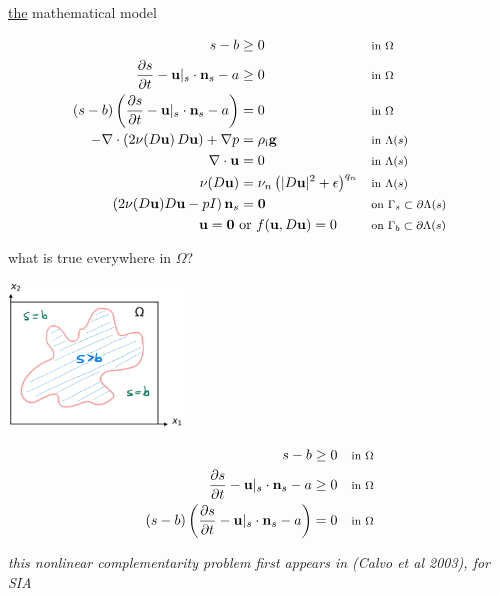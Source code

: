 \documentclass[10pt,dvipsnames]{beamer}
\newcommand{\bg}{\mathbf{g}}
\newcommand{\bn}{\mathbf{n}}
\newcommand{\bu}{\mathbf{u}}
\newcommand{\bzero}{\bm{0}}
\newcommand{\eps}{\epsilon}
\newcommand{\rhoi}{\rho_{\text{i}}}
\newcommand{\where}[1]{\text{\footnotesize #1}}
\begin{document}
\begin{frame}{\underline{the} mathematical model}

\begin{align*}
s - b &\ge 0 & &\where{in $\Omega$} \\
\frac{\partial s}{\partial t} - \bu|_s \cdot \bn_s - a &\ge 0 & &\where{in $\Omega$} \\
(s - b) \left(\frac{\partial s}{\partial t} - \bu|_s \cdot \bn_s - a\right) &= 0 & &\where{in $\Omega$} \\
- \nabla \cdot \left(2 \nu(D\bu)\, D\bu\right) + \nabla p &= \rhoi \bg && \where{in $\Lambda(s)$} \\
\nabla \cdot \bu &= 0 && \where{in $\Lambda(s)$} \\
\nu(D\bu) &= \nu_n \left(|D\bu|^2 + \eps\right)^{q_n} && \where{in $\Lambda(s)$} \\
\left(2 \nu(D\bu) D\bu - pI\right) \bn_s &= \bzero && \where{on $\Gamma_s \subset \partial\Lambda(s)$} \\
\bu  = \bzero \text{ } &\text{or } f(\bu,D\bu)=0 && \where{on $\Gamma_b \subset \partial\Lambda(s)$}
\end{align*}
\end{frame}


\begin{frame}{what is true \alert{everywhere} in $\Omega$?}

\hfill \includegraphics[width=0.35\textwidth]{mapplane}

\begin{align*}
s - b &\ge 0 & &\where{in $\Omega$} \\
\frac{\partial s}{\partial t} - \bu|_s \cdot \bn_s - a &\ge 0 & &\where{in $\Omega$} \\
(s - b) \left(\frac{\partial s}{\partial t} - \bu|_s \cdot \bn_s - a\right) &= 0 & &\where{in $\Omega$}
\end{align*}

\vspace{10mm}
{\footnotesize \emph{this nonlinear complementarity problem first appears in (Calvo et al 2003), \emph{for SIA}}}
\end{frame}
\end{document}
